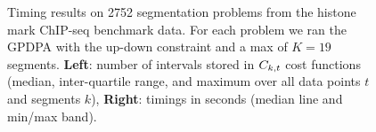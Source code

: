 \documentclass{article}
\begin{document}






\begin{figure}[b!]
  \centering
  \parbox{0.49\textwidth}{
    
  }
  \parbox{0.49\textwidth}{
    
  }
  \vskip -0.5cm
  \caption{Timing results on 2752 segmentation problems from the
    histone mark ChIP-seq benchmark data. For each problem we ran the
    GPDPA with the up-down constraint and a max of $K=19$
    segments.  \textbf{Left}: number of intervals stored in
    $C_{k,t}$ cost functions (median, inter-quartile range, and
    maximum over all data points $t$ and segments $k$),
    \textbf{Right}: timings in seconds (median line and min/max
    band).}
  \label{fig:timings}
\end{figure}
\end{document}
